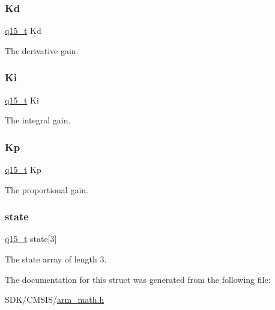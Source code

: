 \subsubsection{\texorpdfstring{Kd}{Kd}}
{\footnotesize\ttfamily \mbox{\hyperlink{arm__math_8h_ab5a8fb21a5b3b983d5f54f31614052ea}{q15\+\_\+t}} Kd}

The derivative gain. \mbox{\label{structarm__pid__instance__q15_a19d5059baf06dd52266260d096702d0a}} 
\subsubsection{\texorpdfstring{Ki}{Ki}}
{\footnotesize\ttfamily \mbox{\hyperlink{arm__math_8h_ab5a8fb21a5b3b983d5f54f31614052ea}{q15\+\_\+t}} Ki}

The integral gain. \mbox{\label{structarm__pid__instance__q15_afef61fb3b64c73f2cd0c91d9dcf95679}} 
\subsubsection{\texorpdfstring{Kp}{Kp}}
{\footnotesize\ttfamily \mbox{\hyperlink{arm__math_8h_ab5a8fb21a5b3b983d5f54f31614052ea}{q15\+\_\+t}} Kp}

The proportional gain. \mbox{\label{structarm__pid__instance__q15_a4c4e19d77015f5f7a31a1daf0faf31b6}} 
\subsubsection{\texorpdfstring{state}{state}}
{\footnotesize\ttfamily \mbox{\hyperlink{arm__math_8h_ab5a8fb21a5b3b983d5f54f31614052ea}{q15\+\_\+t}} state\mbox{[}3\mbox{]}}

The state array of length 3. 

The documentation for this struct was generated from the following file\+:\begin{DoxyCompactItemize}
\item 
S\+D\+K/\+C\+M\+S\+I\+S/\mbox{\hyperlink{arm__math_8h}{arm\+\_\+math.\+h}}\end{DoxyCompactItemize}
